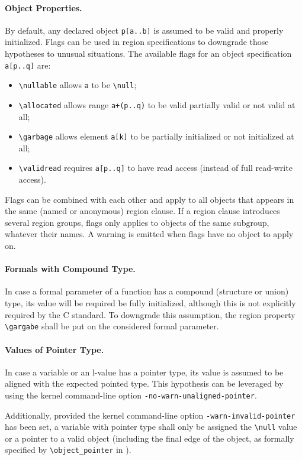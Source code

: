 \paragraph{Object Properties.}
By default, any declared object \verb+p[a..b]+ is assumed to be valid and
properly initialized. Flags can be used in region specifications to downgrade
those hypotheses to unusual situations. The available flags for an
object specification \verb+a[p..q]+ are:
\begin{itemize}
  \item \verb+\nullable+ allows \verb+a+ to be \verb+\null+;
  \item \verb+\allocated+ allows range \verb$a+(p..q)$ to be valid partially
  valid or not valid at all;
  \item \verb+\garbage+ allows element \verb+a[k]+ to be partially initialized
  or not initialized at all;
  \item \verb+\validread+ requires \verb+a[p..q]+ to have read access (instead
  of full read-write access).
\end{itemize}
Flags can be combined with each other and apply to all objects that appears in
the same (named or anonymous) region clause. If a region clause introduces
several region groups, flags only applies to objects of the same subgroup,
whatever their names. A warning is emitted when flags have no object to apply on.

\paragraph{Formals with Compound Type.}
In case a formal parameter of a function has a compound (structure or union)
type, its value will be required be fully initialized, although this is not
explicitly required by the C standard. To downgrade this assumption, the region
property \verb+\gargabe+ shall be put on the considered formal parameter.

\paragraph{Values of Pointer Type.}
In case a variable or an l-value has a pointer type, its value is assumed to be
aligned with the expected pointed type. This hypothesis can be leveraged by
using the kernel command-line option \verb+-no-warn-unaligned-pointer+.

\noindent Additionally, provided the kernel command-line option
\verb+-warn-invalid-pointer+ has been set, a variable with pointer type shall
only be assigned the \verb+\null+ value or a pointer to a valid object
(including the final edge of the object, as formally specified by
\verb+\object_pointer+ in \acsl).


